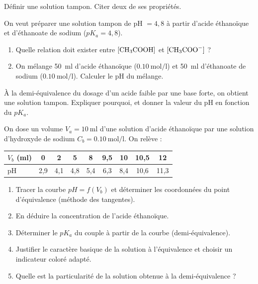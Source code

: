 
\exo{} Définir une solution tampon. Citer deux de ses propriétés.

\exo{} On veut préparer une solution tampon de pH $= 4{,}8$ à partir d'acide
éthanoïque et d'éthanoate de sodium ($pK_a = 4{,}8$).
\begin{enumerate}[label=\arabic*)]
\item Quelle relation doit exister entre $[\ce{CH3COOH}]$ et $[\ce{CH3COO-}]$ ?
\item On mélange \SI{50}{\milli\litre} d'acide éthanoïque
($\SI{0.10}{\mol\per\litre}$) et \SI{50}{\milli\litre} d'éthanoate de sodium
($\SI{0.10}{\mol\per\litre}$). Calculer le pH du mélange.
\end{enumerate}

\exo{} À la demi-équivalence du dosage d'un acide faible par une base forte,
on obtient une solution tampon. Expliquer pourquoi, et donner la valeur du pH en
fonction du $pK_a$.


On dose un volume $V_a = \SI{10}{\milli\litre}$ d'une solution d'acide éthanoïque par
une solution d'hydroxyde de sodium $C_b = \SI{0.10}{\mol\per\litre}$. On relève :
\begin{center}\small
\begin{tabular}{l|cccccccc}
$V_b$ (\si{\milli\litre}) & 0 & 2 & 5 & 8 & 9{,}5 & 10 & 10{,}5 & 12 \\ \hline
pH & 2{,}9 & 4{,}1 & 4{,}8 & 5{,}4 & 6{,}3 & 8{,}4 & 10{,}6 & 11{,}3 \\
\end{tabular}
\end{center}
\begin{enumerate}[label=\arabic*)]
\item Tracer la courbe $pH = f(V_b)$ et déterminer les coordonnées du point
d'équivalence (méthode des tangentes).
\item En déduire la concentration de l'acide éthanoïque.
\item Déterminer le $pK_a$ du couple à partir de la courbe (demi-équivalence).
\item Justifier le caractère basique de la solution à l'équivalence et choisir un
indicateur coloré adapté.
\item Quelle est la particularité de la solution obtenue à la demi-équivalence ?
\end{enumerate}
